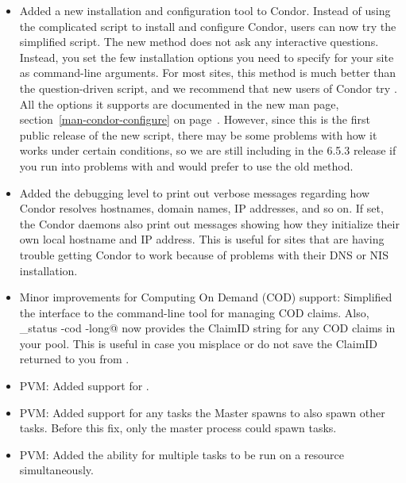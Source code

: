 \begin{itemize}

\item Added a new installation and configuration tool to Condor.
  Instead of using the complicated  script to install
  and configure Condor, users can now try the simplified
   script.
  The new method does not ask any interactive questions.
  Instead, you set the few installation options you need to specify
  for your site as command-line arguments.
  For most sites, this method is much better than the question-driven
   script, and we recommend that new users of Condor
  try .
  All the options it supports are documented in the new
   man page, section~\ref{man-condor-configure} on
  page~\pageref{man-condor-configure}. 
  However, since this is the first public release of the new script,
  there may be some problems with how it works under certain
  conditions, so we are still including  in the 6.5.3 
  release if you run into problems with  and would
  prefer to use the old method. 

\item Added the  debugging level to print out verbose
  messages regarding how Condor resolves hostnames, domain names,
  IP addresses, and so on.
  If set, the Condor daemons also print out messages showing how they
  initialize their own local hostname and IP address.
  This is useful for sites that are having trouble getting Condor to
  work because of problems with their DNS or NIS installation.

\item Minor improvements for Computing On Demand (COD) support: 
  Simplified the interface to the  command-line tool
  for managing COD claims.
  Also, \verb@condor_status -cod -long@ now provides the ClaimID
  string for any COD claims in your pool. 
  This is useful in case you misplace or do not save the ClaimID
  returned to you from .

\item PVM: Added support for .

\item PVM: Added support for any tasks the Master spawns to also spawn other
	tasks. Before this fix, only the master process could spawn tasks.

\item PVM: Added the ability for multiple tasks to be run on a resource
	simultaneously. 


\end{itemize}
